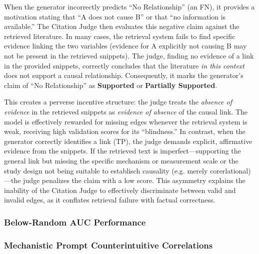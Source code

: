 When the generator incorrectly predicts ``No Relationship'' (an FN), it provides a motivation stating that ``A does not cause B'' or that ``no information is available.'' The Citation Judge then evaluates this negative claim against the retrieved literature. In many cases, the retrieval system fails to find specific evidence linking the two variables (evidence for A explicitly not causing B may not be present in the retrieved snippets). The judge, finding no evidence of a link in the provided snippets, correctly concludes that the literature \textit{in this context} does not support a causal relationship. Consequently, it marks the generator's claim of ``No Relationship'' as \textbf{Supported} or \textbf{Partially Supported}.

This creates a perverse incentive structure: the judge treats the \textit{absence of evidence} in the retrieved snippets as \textit{evidence of absence} of the causal link. The model is effectively rewarded for missing edges whenever the retrieval system is weak, receiving high validation scores for its ``blindness.'' In contrast, when the generator correctly identifies a link (TP), the judge demands explicit, affirmative evidence from the snippets. If the retrieved text is imperfect---supporting the general link but missing the specific mechanism or measurement scale or the study design not being suitable to establisch causality (e.g. merely corerlational)---the judge penalizes the claim with a low score. This asymmetry explains the inability of the Citation Judge to effectively discriminate between valid and invalid edges, as it conflates retrieval failure with factual correctness.


\subsubsection{Below-Random AUC Performance}

\subsubsection{Mechanistic Prompt Counterintuitive Correlations}

